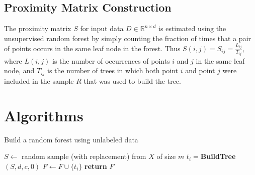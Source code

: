 \subsection{Proximity Matrix Construction}\label{prox}
The proximity matrix $S$ for input data $D \in \mathbb{R}^{n \times d} $ is estimated using the unsupervised random forest by simply counting the fraction of times that a pair of points occurs in the same leaf node in the forest.
Thus $S(i,j) = S_{ij} = \frac{L_{ij}}{T_{ij}} $,
where $L(i,j)$ is the number of occurrences of points $i$ and $j$ in the
same leaf node,
and $T_{ij}$ is the number of trees in which both point $i$ and point $j$
were included in the sample $R$ that was used to build the tree.


 

\section{Algorithms} \label{sec:algorithms}

\begin{algorithm}
\caption{Build a random forest using unlabeled data}\label{alg:buildRF}
\begin{algorithmic}[1]


	\State $S \gets $ random sample (with replacement) from $X$ of size $m$ 
	\State $t_i = $\textbf{BuildTree}$(S, d, c, 0)$
	\State $F \gets F \cup \lbrace t_i \rbrace$
	\State \textbf{return} $F$
\EndFor
\EndProcedure
\end{algorithmic}
\end{algorithm}




